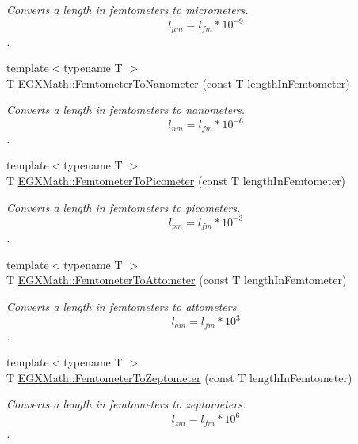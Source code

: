 \begin{DoxyCompactItemize}
\begin{DoxyCompactList}\small\item\em Converts a length in femtometers to micrometers. \[ l_{\mu m}=l_{fm} * 10^{-9} \]. \end{DoxyCompactList}\item 
{\footnotesize template$<$typename T $>$ }\\T \mbox{\hyperlink{group___e_g_x_math-_conversions-_length_conversions-_s_i-_femtometer-_s_i_ga61aa82ad734717567c959f0d4e840076}{E\+G\+X\+Math\+::\+Femtometer\+To\+Nanometer}} (const T length\+In\+Femtometer)
\begin{DoxyCompactList}\small\item\em Converts a length in femtometers to nanometers. \[ l_{nm}=l_{fm} * 10^{-6} \]. \end{DoxyCompactList}\item 
{\footnotesize template$<$typename T $>$ }\\T \mbox{\hyperlink{group___e_g_x_math-_conversions-_length_conversions-_s_i-_femtometer-_s_i_gadfcd6b374d4134cad0ac1ce7a8e50509}{E\+G\+X\+Math\+::\+Femtometer\+To\+Picometer}} (const T length\+In\+Femtometer)
\begin{DoxyCompactList}\small\item\em Converts a length in femtometers to picometers. \[ l_{pm}=l_{fm} * 10^{-3} \]. \end{DoxyCompactList}\item 
{\footnotesize template$<$typename T $>$ }\\T \mbox{\hyperlink{group___e_g_x_math-_conversions-_length_conversions-_s_i-_femtometer-_s_i_ga62157df6cfd3d6b801c521105b7f4f71}{E\+G\+X\+Math\+::\+Femtometer\+To\+Attometer}} (const T length\+In\+Femtometer)
\begin{DoxyCompactList}\small\item\em Converts a length in femtometers to attometers. \[ l_{am}=l_{fm} * 10^{3} \]. \end{DoxyCompactList}\item 
{\footnotesize template$<$typename T $>$ }\\T \mbox{\hyperlink{group___e_g_x_math-_conversions-_length_conversions-_s_i-_femtometer-_s_i_ga9bcc5cf611f6646652effc080ce29f1a}{E\+G\+X\+Math\+::\+Femtometer\+To\+Zeptometer}} (const T length\+In\+Femtometer)
\begin{DoxyCompactList}\small\item\em Converts a length in femtometers to zeptometers. \[ l_{zm}=l_{fm} * 10^{6} \]. \end{DoxyCompactList}\item 

\end{DoxyCompactItemize}
